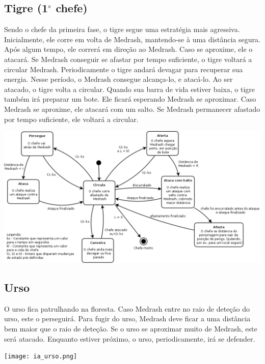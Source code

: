 \subsection{Tigre (1$^\circ$ chefe)}

Sendo o chefe da primeira fase, o tigre segue uma estratégia mais agressiva.
Inicialmente, ele corre em volta de Medrash, mantendo-se à uma distância
 segura. Após algum tempo, ele correrá em direção ao Medrash. Caso se
 aproxime, ele o atacará. Se Medrash conseguir se afastar por tempo
 suficiente, o tigre voltará a circular Medrash.
Periodicamente o tigre andará devagar para recuperar sua energia. Nesse
período, o Medrash consegue alcança-lo, e atacá-lo. Ao ser atacado, o tigre
volta a circular.
Quando sua barra de vida estiver baixa, o tigre também irá preparar um
bote. Ele ficará esperando Medrash se aproximar. Caso Medrash se aproxime,
 ele atacará com um salto. Se Medrash permanecer afastado por tempo 
suficiente, ele voltará a circular.

\begin{center}
 \includegraphics[scale=0.44]{ia_tigre.png}
\end{center}

\subsection{Urso}

O urso fica patrulhando na floresta. Caso Medrash entre no raio de deteção
do urso, este o perseguirá. Para fugir do urso, Medrash deve ficar a uma
distância bem maior que o raio de deteção.
Se o urso se aproximar muito de Medrash, este será atacado. Enquanto estiver
próximo, o urso, periodicamente, irá se defender.

\begin{center}
 \texttt{[image: ia\_urso.png]}
\end{center}

